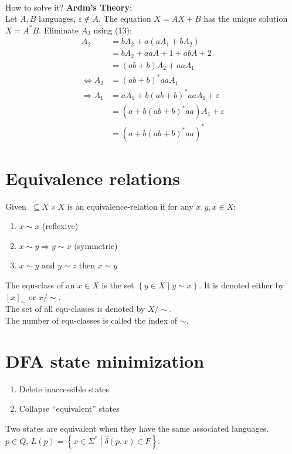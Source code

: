 \documentclass[a4paper]{article}
\begin{document}
\\How to solve it? \textbf{Ardm's Theory}: \\Let $A,B$ languages, $\varepsilon \notin A$.
The equation $X=AX+B$ has the unique solution $X=A^*B$.
Eliminate $A_3$ using (13):
\begin{align*}
    A_2 &= bA_2 + a(aA_1+bA_2)\\
    &= bA_2 + aaA+1 + abA+2\\
    &= (ab+b)A_2+aaA_1\\
    \Leftrightarrow A_2 &= (ab+b)^*aaA_1\\
    \Rightarrow A_1 &= aA_1 + b(ab+b)^*aaA_1+\varepsilon \\
    &= (a+b(ab+b)^*aa)A_1+\varepsilon\\
    &= (a+b(ab+b)^*aa)^*
\end{align*}
\section{Equivalence relations}
Given $~\subseteq X\times X$ is an equivalence-relation if for any $x,y,x\in X$:
\begin{enumerate}
    \item $x\sim x$ (reflexive)
    \item $x\sim y \Rightarrow y\sim x$ (symmetric)
    \item $x\sim y$ and $y\sim z$ then $x\sim y$
\end{enumerate}
The equ-class of an $x\in X$ is the set $\left\{  y\in X \middle | y\sim x\right\}$.
It is denoted either by $\left[ x \right]_\sim$ or $x/\sim$.
\\The set of all equ-classes is denoted by $X/\sim$.\\
The number of equ-classes is called the index of $\sim$.

\section{DFA state minimization}
\begin{enumerate}
    \item Delete inaccessible states
    \item Collapse ``equivalent'' states
\end{enumerate}
Two states are equivalent when they have the same associated languages.\\
$p\in Q$, $L(p)=\left\{ x\in \Sigma^* \middle | \hat{\delta}(p,x) \in F \right\}$.
\end{document}
